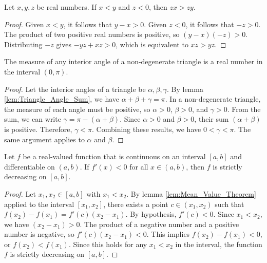 \begin{lemma}
    \label{lem:Inequality_Multiplication_Property}
    Let $x, y, z$ be real numbers. If $x < y$ and $z < 0$, then $zx > zy$.
\end{lemma}

\begin{proof}
    Given $x < y$, it follows that $y - x > 0$. Given $z < 0$, it follows that $-z > 0$. The product of two positive real numbers is positive, so $(y - x)(-z) > 0$. Distributing $-z$ gives $-yz + xz > 0$, which is equivalent to $xz > yz$.
\end{proof}

\begin{lemma}
    \label{lem:Triangle_Angle_Properties}
    The measure of any interior angle of a non-degenerate triangle is a real number in the interval $(0, \pi)$.
\end{lemma}

\begin{proof}
    Let the interior angles of a triangle be $\alpha, \beta, \gamma$. By lemma \ref{lem:Triangle_Angle_Sum}, we have $\alpha + \beta + \gamma = \pi$. In a non-degenerate triangle, the measure of each angle must be positive, so $\alpha > 0$, $\beta > 0$, and $\gamma > 0$. From the sum, we can write $\gamma = \pi - (\alpha + \beta)$. Since $\alpha > 0$ and $\beta > 0$, their sum $(\alpha + \beta)$ is positive. Therefore, $\gamma < \pi$. Combining these results, we have $0 < \gamma < \pi$. The same argument applies to $\alpha$ and $\beta$.
\end{proof}

\begin{lemma}
    \label{lem:Monotonicity_and_Derivatives}
    Let $f$ be a real-valued function that is continuous on an interval $[a, b]$ and differentiable on $(a, b)$. If $f'(x) < 0$ for all $x \in (a, b)$, then $f$ is strictly decreasing on $[a, b]$.
\end{lemma}

\begin{proof}
    Let $x_1, x_2 \in [a, b]$ with $x_1 < x_2$. By lemma \ref{lem:Mean_Value_Theorem} applied to the interval $[x_1, x_2]$, there exists a point $c \in (x_1, x_2)$ such that $f(x_2) - f(x_1) = f'(c)(x_2 - x_1)$. By hypothesis, $f'(c) < 0$. Since $x_1 < x_2$, we have $(x_2 - x_1) > 0$. The product of a negative number and a positive number is negative, so $f'(c)(x_2 - x_1) < 0$. This implies $f(x_2) - f(x_1) < 0$, or $f(x_2) < f(x_1)$. Since this holds for any $x_1 < x_2$ in the interval, the function $f$ is strictly decreasing on $[a, b]$.
\end{proof}

